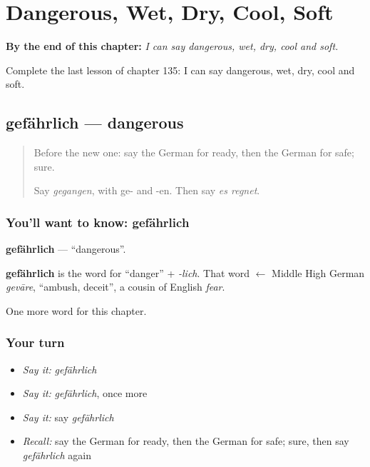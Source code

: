 
\chapter{Dangerous, Wet, Dry, Cool, Soft}
\label{ch:ge-dangerous-wet-dry-cool-soft}

\begin{chapteropening}
\textbf{By the end of this chapter:} \emph{I can say dangerous, wet, dry, cool and soft.}

Complete the last lesson of chapter 135: I can say dangerous, wet, dry, cool and soft.
\end{chapteropening}

\section[gefährlich]{gefährlich — dangerous}

\label{lesson:GE-C135-gefaehrlich}



\begin{quote}
Before the new one: say the German for ready, then the German for safe; sure.

Say \emph{gegangen}, with ge- and -en. Then say \emph{es regnet}.
\end{quote}

\subsection*{You'll want to know: gefährlich}
\textbf{gefährlich} — \textquotedblleft{}dangerous\textquotedblright{}.

\begin{cousinweb}
\textbf{gefährlich} is the word for \textquotedblleft{}danger\textquotedblright{} + \emph{-lich}. That word $\leftarrow$ Middle High German \emph{gevāre}, \textquotedblleft{}ambush, deceit\textquotedblright{}, a cousin of English \emph{fear}.
\end{cousinweb}

\begin{grammarlens}[title={What you've built}]
One more word for this chapter.
\end{grammarlens}

\subsection*{Your turn}
\begin{itemize}
\raggedright
  \item \emph{Say it:} \emph{gefährlich}
  \item \emph{Say it:} \emph{gefährlich}, once more
  \item \emph{Say it:} say \emph{gefährlich}
  \item \emph{Recall:} say the German for ready, then the German for safe; sure, then say \emph{gefährlich} again
\end{itemize}

